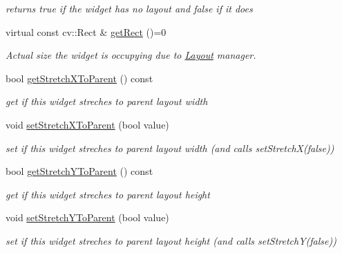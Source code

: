\begin{DoxyCompactItemize}
\begin{DoxyCompactList}\small\item\em returns true if the widget has no layout and false if it does \end{DoxyCompactList}\item 
virtual const cv\+::\+Rect \& \hyperlink{classcanvascv_1_1Widget_afa0105481f639d660de98287a879810c}{get\+Rect} ()=0\hypertarget{classcanvascv_1_1Widget_afa0105481f639d660de98287a879810c}{}\label{classcanvascv_1_1Widget_afa0105481f639d660de98287a879810c}

\begin{DoxyCompactList}\small\item\em Actual size the widget is occupying due to \hyperlink{classcanvascv_1_1Layout}{Layout} manager. \end{DoxyCompactList}\item 
bool \hyperlink{classcanvascv_1_1Widget_ac9c864272c04f65f233c470dec917930}{get\+Stretch\+X\+To\+Parent} () const \hypertarget{classcanvascv_1_1Widget_ac9c864272c04f65f233c470dec917930}{}\label{classcanvascv_1_1Widget_ac9c864272c04f65f233c470dec917930}

\begin{DoxyCompactList}\small\item\em get if this widget streches to parent layout width \end{DoxyCompactList}\item 
void \hyperlink{classcanvascv_1_1Widget_a7b1ed6190950de22565c244f5aac49a4}{set\+Stretch\+X\+To\+Parent} (bool value)\hypertarget{classcanvascv_1_1Widget_a7b1ed6190950de22565c244f5aac49a4}{}\label{classcanvascv_1_1Widget_a7b1ed6190950de22565c244f5aac49a4}

\begin{DoxyCompactList}\small\item\em set if this widget streches to parent layout width (and calls set\+Stretch\+X(false)) \end{DoxyCompactList}\item 
bool \hyperlink{classcanvascv_1_1Widget_a3423f2e0dab494c6da99d43d186760bc}{get\+Stretch\+Y\+To\+Parent} () const \hypertarget{classcanvascv_1_1Widget_a3423f2e0dab494c6da99d43d186760bc}{}\label{classcanvascv_1_1Widget_a3423f2e0dab494c6da99d43d186760bc}

\begin{DoxyCompactList}\small\item\em get if this widget streches to parent layout height \end{DoxyCompactList}\item 
void \hyperlink{classcanvascv_1_1Widget_a825028e2405bfdf9d92d372e60585703}{set\+Stretch\+Y\+To\+Parent} (bool value)\hypertarget{classcanvascv_1_1Widget_a825028e2405bfdf9d92d372e60585703}{}\label{classcanvascv_1_1Widget_a825028e2405bfdf9d92d372e60585703}

\begin{DoxyCompactList}\small\item\em set if this widget streches to parent layout height (and calls set\+Stretch\+Y(false)) \end{DoxyCompactList}\end{DoxyCompactItemize}
